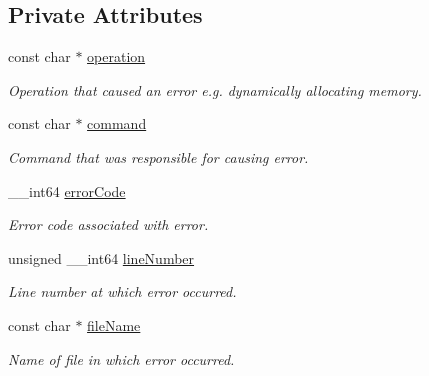 \subsection*{Private Attributes}
\begin{DoxyCompactItemize}
\item 
\hypertarget{class_error_report_a24ae8a14692b673266f93fa869e4f543}{
const char $\ast$ \hyperlink{class_error_report_a24ae8a14692b673266f93fa869e4f543}{operation}}
\label{class_error_report_a24ae8a14692b673266f93fa869e4f543}

\begin{DoxyCompactList}\small\item\em Operation that caused an error e.g. dynamically allocating memory. \item\end{DoxyCompactList}\item 
\hypertarget{class_error_report_a3924c0754aef927067733907ba12409e}{
const char $\ast$ \hyperlink{class_error_report_a3924c0754aef927067733907ba12409e}{command}}
\label{class_error_report_a3924c0754aef927067733907ba12409e}

\begin{DoxyCompactList}\small\item\em Command that was responsible for causing error. \item\end{DoxyCompactList}\item 
\_\-\_\-int64 \hyperlink{class_error_report_a627028539c72742cec0c460eb1240fb5}{errorCode}
\begin{DoxyCompactList}\small\item\em Error code associated with error. \item\end{DoxyCompactList}\item 
\hypertarget{class_error_report_a41b39a5f3d34f1c959970766d5157abc}{
unsigned \_\-\_\-int64 \hyperlink{class_error_report_a41b39a5f3d34f1c959970766d5157abc}{lineNumber}}
\label{class_error_report_a41b39a5f3d34f1c959970766d5157abc}

\begin{DoxyCompactList}\small\item\em Line number at which error occurred. \item\end{DoxyCompactList}\item 
\hypertarget{class_error_report_aa5f68a3df09866ceac9b933f04444f50}{
const char $\ast$ \hyperlink{class_error_report_aa5f68a3df09866ceac9b933f04444f50}{fileName}}
\label{class_error_report_aa5f68a3df09866ceac9b933f04444f50}

\begin{DoxyCompactList}\small\item\em Name of file in which error occurred. \item\end{DoxyCompactList}\end{DoxyCompactItemize}
